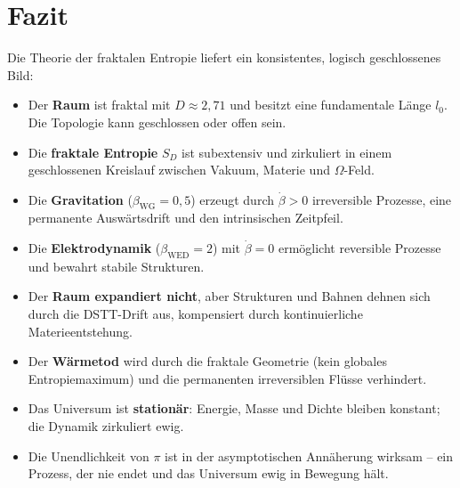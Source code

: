 \documentclass[12pt,a4paper]{article}
\begin{document}
\section{Fazit}

Die Theorie der fraktalen Entropie liefert ein konsistentes, logisch geschlossenes Bild:

\begin{itemize}
    \item Der \textbf{Raum} ist fraktal mit $D \approx 2,71$ und besitzt eine fundamentale Länge $l_0$. Die Topologie kann geschlossen oder offen sein.
    \item Die \textbf{fraktale Entropie} $S_D$ ist subextensiv und zirkuliert in einem geschlossenen Kreislauf zwischen Vakuum, Materie und $\Omega$-Feld.
    \item Die \textbf{Gravitation} ($\beta_{\text{WG}} = 0,5$) erzeugt durch $\dot{\beta}>0$ irreversible Prozesse, eine permanente Auswärtsdrift und den intrinsischen Zeitpfeil.
    \item Die \textbf{Elektrodynamik} ($\beta_{\text{WED}} = 2$) mit $\dot{\beta}=0$ ermöglicht reversible Prozesse und bewahrt stabile Strukturen.
    \item Der \textbf{Raum expandiert nicht}, aber Strukturen und Bahnen dehnen sich durch die DSTT-Drift aus, kompensiert durch kontinuierliche Materieentstehung.
    \item Der \textbf{Wärmetod} wird durch die fraktale Geometrie (kein globales Entropiemaximum) und die permanenten irreversiblen Flüsse verhindert.
    \item Das Universum ist \textbf{stationär}: Energie, Masse und Dichte bleiben konstant; die Dynamik zirkuliert ewig.
    \item Die Unendlichkeit von $\pi$ ist in der asymptotischen Annäherung wirksam – ein Prozess, der nie endet und das Universum ewig in Bewegung hält.
\end{itemize}

\begin{center}
\end{center}
\end{document}
